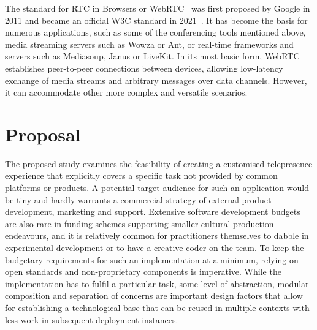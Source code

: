 The standard for \ac{RTC} in Browsers or \ac{WebRTC}~\parencite{webRtcSpec} was first proposed by Google in 2011 and became an official \ac{W3C} standard in 2021~\parencite{webRtcOfficialWebStandard}.
It has become the basis for numerous applications, such as some of the conferencing tools mentioned above, media streaming servers such as Wowza or Ant, or real-time frameworks and servers such as Mediasoup, Janus or LiveKit.
In its most basic form, \ac{WebRTC} establishes peer-to-peer connections between devices, allowing low-latency exchange of media streams and arbitrary messages over data channels.
However, it can accommodate other more complex and versatile scenarios.

\section{Proposal}
\label{sec:proposal}

The proposed study examines the feasibility of creating a customised telepresence experience that explicitly covers a specific task not provided by common platforms or products.
A potential target audience for such an application would be tiny and hardly warrants a commercial strategy of external product development, marketing and support.
Extensive software development budgets are also rare in funding schemes supporting smaller cultural production endeavours, and it is relatively common for practitioners themselves to dabble in experimental development or to have a creative coder on the team.
To keep the budgetary requirements for such an implementation at a minimum, relying on open standards and non-proprietary components is imperative.
While the implementation has to fulfil a particular task, some level of abstraction, modular composition and separation of concerns are important design factors that allow for establishing a technological base that can be reused in multiple contexts with less work in subsequent deployment instances.

